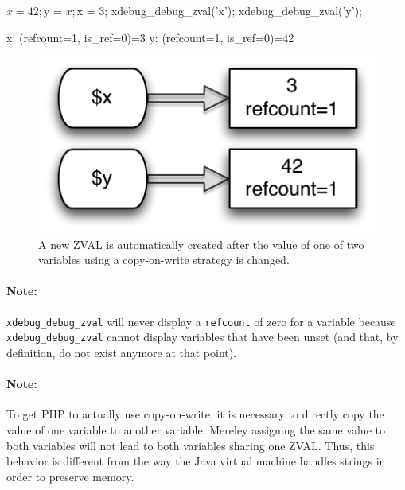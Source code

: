\begin{phpcode}
$x = 42;
$y = $x;
$x = 3;
xdebug_debug_zval('x');
xdebug_debug_zval('y');
\end{phpcode}

\begin{textcode}
x: (refcount=1, is_ref=0)=3
y: (refcount=1, is_ref=0)=42
\end{textcode}

\begin{figure}[htb]
  \begin{center}
    \includegraphics[scale=0.8]{images/x_3_y_42}
    \caption{A new ZVAL is automatically created after the value of one of two variables using a copy-on-write strategy is changed.}
    \label{fig:new-zval-after-copy-on-write}
  \end{center}
\end{figure}

\paragraph{Note:} \texttt{xdebug\_debug\_zval} will never display a \texttt{refcount} of zero for a variable because \texttt{xdebug\_debug\_zval} cannot display variables that have been unset (and that, by definition, do not exist anymore at that point).

\paragraph{Note:} To get PHP to actually use copy-on-write, it is necessary to directly copy the value of one variable to another variable. Mereley assigning the same value to both variables will not lead to both variables sharing one ZVAL. Thus, this behavior is different from the way the Java virtual machine handles strings in order to preserve memory.~\cite[chapter~2]{jvm-spec}


